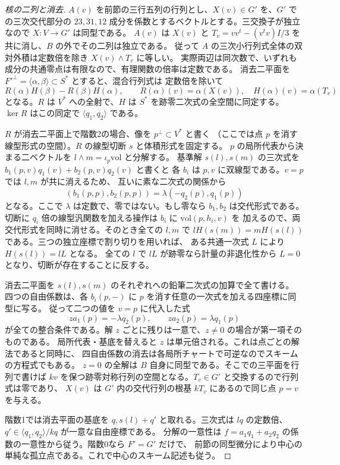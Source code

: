 \begin{proof}[核の二列と消去]
$A(v)$ を前節の三行五列の行列とし、$X(v)\in G'$ を、$G'$ での三次交代部分の
$23,31,12$ 成分を係数とするベクトルとする。三交換子が独立なので $X:V\to G'$ は同型である。
$A(v)$ は $X(v)$ と $T_v=vv^t-(v^tv)I/3$ を共に消し、$B$ の外でその二列は独立である。
従って $A$ の三次小行列式全体の双対外積は定数倍を除き $X(v)\wedge T_v$ に等しい。
実際両辺は同次数で、いずれも成分の共通零点は有限なので、有理関数の倍率は定数である。
消去二平面を $F'^\perp=\langle\alpha,\beta\rangle\subset S^*$ とすると、混合行列式は
定数倍を除いて
\[
           R(\alpha)H(\beta)-R(\beta)H(\alpha),\qquad
      R(\alpha)(v)=\alpha(X(v)),\quad H(\alpha)(v)=\alpha(T_v)
\]
となる。$R$ は $V^*$ への全射で、$H$ は $S^*$ を跡零二次式の全空間に同定する。
$\ker R$ はこの同定で $\langle q_1,q_2\rangle$ である。

$R$ が消去二平面上で階数2の場合、像を $p^\perp\subset V^*$ と書く
（ここでは点 $p$ を消す線型形式の空間）。$R$ の線型切断 $s$ と体積形式を固定する。
$p$ の局所代表から決まる二ベクトルを $l\wedge m=\iota_p\mathrm{vol}$ と分解する。
基準解 $s(l),s(m)$ の三次式を $b_1(p,v)q_1(v)+b_2(p,v)q_2(v)$ と書くと
各 $b_i$ は $p,v$ に双線型である。$v=p$ では $l,m$ が共に消えるため、
互いに素な二次式の関係から
\[
       (b_1(p,p),b_2(p,p))=\lambda(-q_2(p),q_1(p))
\]
となる。ここで $\lambda$ は定数で、零ではない。もし零なら $b_1,b_2$ は交代形式である。
切断に $q_i$ 倍の線型汎関数を加える操作は $b_i$ に $\mathrm{vol}(p,h_i,v)$ を
加えるので、両交代形式を同時に消せる。そのとき全ての $l,m$ で
$l H(s(m))=m H(s(l))$ である。三つの独立座標で割り切りを用いれば、
ある共通一次式 $L$ により $H(s(l))=lL$ となる。
全ての $l$ で $lL$ が跡零なら計量の非退化性から $L=0$ となり、切断が存在することに反する。

消去二平面を $s(l),s(m)$ のそれぞれへの鉛筆二次式の加算で全て書ける。
四つの自由係数は、各 $b_i(p,-)$ に $p$ を消す任意の一次式を加える四座標に同型に写る。
従って二つの値を $v=p$ に代入した式
\[
       z a_1(p)=-\lambda q_2(p),\qquad z a_2(p)=\lambda q_1(p)
\]
が全ての整合条件である。解 $z$ ごとに残りは一意で、$z\ne0$ の場合が第一項そのものである。
局所代表・基底を替えると $z$ は単元倍される。これは点ごとの解法であると同時に、
四自由係数の消去は各局所チャートで可逆なのでスキームの方程式でもある。
$z=0$ の全解は $B$ 自身に同型である。そこでの三平面を行列で書けば
$kv$ を保つ跡零対称行列の空間となる。$T_v\in G'$ と交換するので行列式は零であり、
$X(v)$ は $G'$ 内の交代行列の根基 $kT_v$ にあるので同じ点 $p=v$ を与える。

階数1では消去平面の基底を $q, s(l)+q'$ と取れる。三次式は $lq$ の定数倍、
$q'\in\langle q_1,q_2\rangle/kq$ が一意な自由座標である。
分解の一意性は $f=a_1q_1+a_2q_2$ の係数の一意性から従う。階数0なら $F'=G'$ だけで、
前節の同型微分により中心の単純な孤立点である。これで中心のスキーム記述も従う。


\end{proof}
